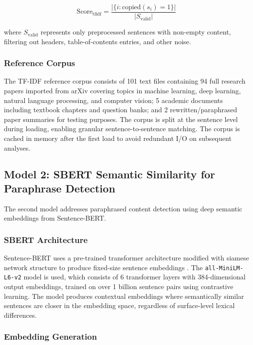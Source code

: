 \documentclass[conference]{IEEEtran}
\begin{document}
\begin{equation}
\text{Score}_{\text{tfidf}} = \frac{|\{i : \text{copied}(s_i) = 1\}|}{|S_{\text{valid}}|}
\label{eq_tfidf_score}
\end{equation}

\noindent where $S_{\text{valid}}$ represents only preprocessed sentences with non-empty content, filtering out headers, table-of-contents entries, and other noise.

\subsubsection{Reference Corpus}

The TF-IDF reference corpus consists of 101 text files containing 94 full research papers imported from arXiv covering topics in machine learning, deep learning, natural language processing, and computer vision; 5 academic documents including textbook chapters and question banks; and 2 rewritten/paraphrased paper summaries for testing purposes. The corpus is split at the sentence level during loading, enabling granular sentence-to-sentence matching. The corpus is cached in memory after the first load to avoid redundant I/O on subsequent analyses.

\subsection{Model 2: SBERT Semantic Similarity for Paraphrase Detection}

The second model addresses paraphrased content detection using deep semantic embeddings from Sentence-BERT.

\subsubsection{SBERT Architecture}

Sentence-BERT uses a pre-trained transformer architecture modified with siamese network structure to produce fixed-size sentence embeddings \cite{b19}. The \texttt{all-MiniLM-L6-v2} model is used, which consists of 6 transformer layers with 384-dimensional output embeddings, trained on over 1 billion sentence pairs using contrastive learning. The model produces contextual embeddings where semantically similar sentences are closer in the embedding space, regardless of surface-level lexical differences.

\subsubsection{Embedding Generation}
\end{document}
